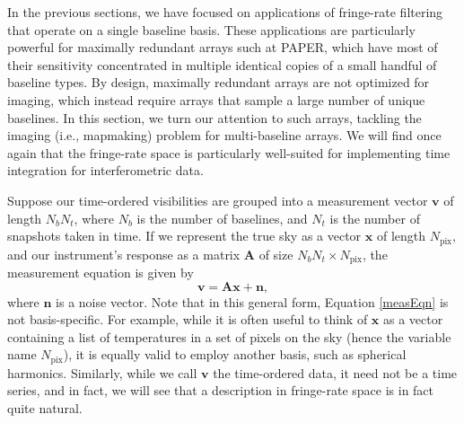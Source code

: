 \documentclass[twocolumn,apj,numberedappendix]{emulateapj}
\newcommand{\vis}{\mathbf{v}}
\newcommand{\x}{\mathbf{x}}
\newcommand{\A}{\mathbf{A}}
\begin{document}
In the previous sections, we have focused on applications of fringe-rate filtering that operate on a single baseline basis. These applications are particularly powerful for maximally redundant arrays such at PAPER, which have most of their sensitivity concentrated in multiple identical copies of a small handful of baseline types. By design, maximally redundant arrays are not optimized for imaging, which instead require arrays that sample a large number of unique baselines. In this section, we turn our attention to such arrays, tackling the imaging (i.e., mapmaking) problem for multi-baseline arrays. We will find once again that the fringe-rate space is particularly well-suited for implementing time integration for interferometric data.


Suppose our time-ordered visibilities are grouped into a measurement vector
$\vis$ of length $N_b N_t$, where $N_b$ is the number of baselines, and $N_t$
is the number of snapshots taken in time.  If we represent the true sky as a
vector $\x$ of length $N_\textrm{pix}$, and our instrument's response as a
matrix $\A$ of size $N_b N_t \times N_\textrm{pix}$, the measurement equation
is given by
\begin{equation}
\label{measEqn}
\vis = \A \x + \mathbf{n},
\end{equation}
where $\mathbf{n}$ is a noise vector.  Note that in this general form, Equation
\eqref{measEqn} is not basis-specific.  For example, while it is often useful
to think of $\x$ as a vector containing a list of temperatures in a set of
pixels on the sky (hence the variable name $N_\textrm{pix}$), it is equally
valid to employ another basis, such as spherical harmonics.  Similarly, while
we call $\vis$ the time-ordered data, it need not be a time series, and in
fact, we will see that a description in fringe-rate space is in fact quite natural.
\end{document}
